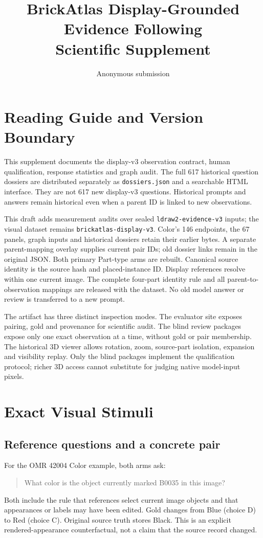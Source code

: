 \documentclass[10pt,twocolumn,letterpaper]{article}
\title{BrickAtlas Display-Grounded Evidence Following\\Scientific Supplement}
\author{Anonymous submission}
\begin{document}
\maketitle
\raggedbottom

\section{Reading Guide and Version Boundary}
This supplement documents the display-v3 observation contract,
human qualification, response statistics and graph audit. The full
617 historical question dossiers are distributed separately as
\texttt{dossiers.json} and a searchable HTML interface. They are not
617 new display-v3 questions. Historical prompts and answers remain
historical even when a parent ID is linked to new observations.

This draft adds measurement audits over sealed \texttt{ldraw2-evidence-v3}
inputs; the visual dataset remains \texttt{brickatlas-display-v3}.
Color's 146 endpoints, the 67 panels,
graph inputs and historical dossiers retain their earlier bytes.
A separate parent-mapping overlay supplies current pair IDs; old
dossier links remain in the original JSON. Both primary Part-type
arms are rebuilt. Canonical source identity is the
source hash and placed-instance ID. Display references resolve within
one current image. The complete four-part identity rule and all
parent-to-observation mappings are released with the dataset.
No old model answer or review is transferred to a new prompt.

The artifact has three distinct inspection modes. The evaluator site
exposes pairing, gold and provenance for scientific audit. The blind
review packages expose only one exact observation at a time, without
gold or pair membership. The historical 3D viewer allows rotation,
zoom, source-part isolation, expansion and visibility replay.
Only the blind packages implement the qualification protocol; richer
3D access cannot substitute for judging native model-input pixels.

\section{Exact Visual Stimuli}
\subsection{Reference questions and a concrete pair}
For the OMR 42004 Color example, both arms ask:
\begin{quote}\small
What color is the object currently marked B0035 in this image?
\end{quote}
Both include the rule that references select current image objects and
that appearances or labels may have been edited. Gold changes from
Blue (choice D) to Red (choice C). Original source truth stores Black.
This is an explicit rendered-appearance counterfactual, not a claim
that the source record changed.
\end{document}
